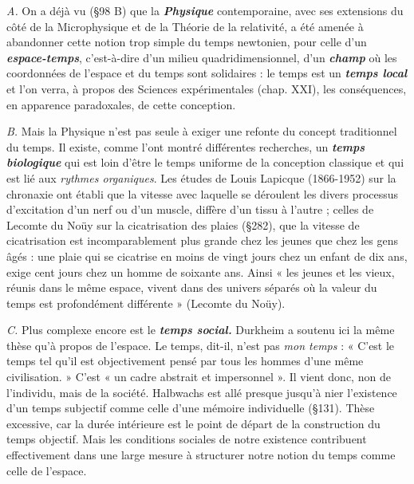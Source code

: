 {\it A.} On a déjà vu (\S98 B) que la \textbf{\textit {Physique}}
contemporaine, avec
ses extensions du côté de la Microphysique et de la Théorie de la
relativité, a été amenée à abandonner cette notion trop simple du
temps newtonien, pour celle d’un \textbf{\textit {espace-temps}},
c’est-à-dire d’un milieu quadridimensionnel, d’un \textbf{\textit {champ}}
où les coordonnées de l’espace et du temps sont solidaires :
le temps est un \textbf{\textit {temps local}} et l’on
verra, à propos des Sciences expérimentales (chap. XXI), les conséquences,
en apparence paradoxales, de cette conception.

{\it B.} Mais la Physique n’est pas seule à exiger une refonte du concept
traditionnel du temps. Il existe, comme l’ont montré différentes
recherches, un \textbf{\textit {temps biologique}}
qui est loin d’être le temps uniforme
de la conception classique et qui est lié aux {\it rythmes organiques}.
Les études de Louis Lapicque (1866-1952) sur la chronaxie ont établi
que la vitesse avec laquelle se déroulent les divers processus d’excitation
d’un nerf ou d’un muscle, diffère d’un tissu à l’autre ; celles
de Lecomte du Noüy sur la cicatrisation des plaies (\S 282),
que la vitesse de cicatrisation est incomparablement plus
grande chez les jeunes que chez les gens âgés : une plaie qui se cicatrise
en moins de vingt jours chez un enfant de dix ans, exige cent
jours chez un homme de soixante ans. Ainsi « les jeunes et les vieux,
réunis dans le même espace, vivent dans des univers séparés où la
valeur du temps est profondément différente » (Lecomte du Noüy).

{\it C.} Plus complexe encore est le \textbf{\textit {temps social.}}
Durkheim a soutenu
ici la même thèse qu’à propos de l’espace. Le temps, dit-il, n’est pas
{\it mon temps} : « C’est le temps tel qu’il est objectivement pensé par
tous les hommes d’une même civilisation. » C’est « un cadre abstrait
et impersonnel ». Il vient donc, non de l'individu, mais de la société.
Halbwachs est allé presque jusqu’à nier l'existence d’un temps
subjectif comme celle d’une mémoire individuelle (\S 131). Thèse
excessive, car la durée intérieure est le point de départ de la construction
du temps objectif. Mais les conditions sociales de notre existence
contribuent effectivement dans une large mesure à structurer notre
notion du temps comme celle de l’espace.

